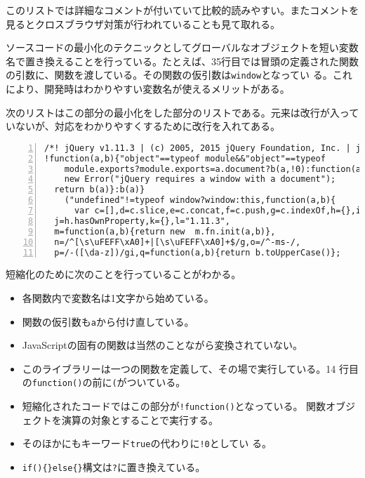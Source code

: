 このリストでは詳細なコメントが付いていて比較的読みやすい。またコメントを
見るとクロスブラウザ対策が行われていることも見て取れる。

ソースコードの最小化のテクニックとしてグローバルなオブジェクトを短い変数
名で置き換えることを行っている。たとえば、35行目では冒頭の定義された関数
の引数に、関数を渡している。その関数の仮引数は\texttt{window}となってい
る。これにより、開発時はわかりやすい変数名が使えるメリットがある。

次のリストはこの部分の最小化をした部分のリストである。元来は改行が入って
いないが、対応をわかりやすくするために改行を入れてある。

\begin{Verbatim}[numbers=left, fontsize=\small]
/*! jQuery v1.11.3 | (c) 2005, 2015 jQuery Foundation, Inc. | jquery.org/license */
!function(a,b){"object"==typeof module&&"object"==typeof
    module.exports?module.exports=a.document?b(a,!0):function(a){if(!a.document)throw
    new Error("jQuery requires a window with a document");
  return b(a)}:b(a)}
    ("undefined"!=typeof window?window:this,function(a,b){
      var c=[],d=c.slice,e=c.concat,f=c.push,g=c.indexOf,h={},i=h.toString,
  j=h.hasOwnProperty,k={},l="1.11.3",
  m=function(a,b){return new  m.fn.init(a,b)},
  n=/^[\s\uFEFF\xA0]+|[\s\uFEFF\xA0]+$/g,o=/^-ms-/,
  p=/-([\da-z])/gi,q=function(a,b){return b.toUpperCase()};
\end{Verbatim}

短縮化のために次のことを行っていることがわかる。
\begin{itemize}
 \item 各関数内で変数名は1文字から始めている。
 \item 関数の仮引数も\texttt{a}から付け直している。
 \item JavaScriptの固有の関数は当然のことながら変換されていない。
 \item このライブラリーは一つの関数を定義して、その場で実行している。14
       行目の\texttt{function()}の前に\texttt{(}がついている。
 \item 短縮化されたコードではこの部分が\texttt{!function()}となっている。
       関数オブジェクトを演算の対象とすることで実行する。
 \item そのほかにもキーワード\texttt{true}の代わりに\texttt{!0}としてい
       る。
 \item \texttt{if()\{\}else\{\}}構文は\texttt{?}に置き換えている。
\end{itemize}
